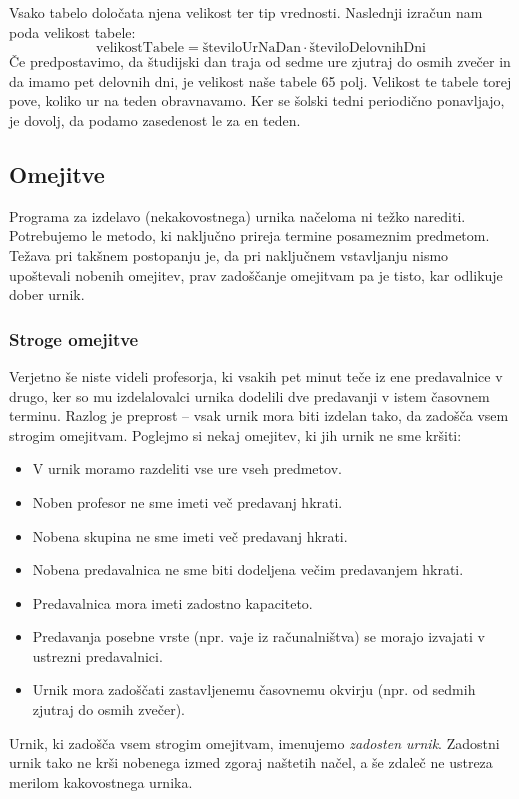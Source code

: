 \documentclass[a4paper,10pt]{article}
\begin{document}
Vsako tabelo določata njena velikost ter tip vrednosti. Naslednji izračun nam poda velikost tabele:
\[
\text{velikostTabele} = \text{številoUrNaDan} \cdot \text{številoDelovnihDni}
\]
Če predpostavimo, da študijski dan traja od sedme ure zjutraj do osmih zvečer in da imamo pet delovnih dni, je velikost naše tabele 65 polj. Velikost te tabele torej pove, koliko ur na teden obravnavamo. Ker se šolski tedni periodično ponavljajo, je dovolj, da podamo zasedenost le za en teden.
\subsection{Omejitve}
Programa za izdelavo (nekakovostnega) urnika načeloma ni težko narediti. Potrebujemo le metodo, ki naključno prireja termine posameznim predmetom. Težava pri takšnem postopanju je, da pri naključnem vstavljanju nismo upoštevali nobenih omejitev, prav zadoščanje omejitvam pa je tisto, kar odlikuje dober urnik.

\subsubsection{Stroge omejitve}
Verjetno še niste videli profesorja, ki vsakih pet minut teče iz ene predavalnice v drugo, ker so mu izdelalovalci urnika dodelili dve predavanji v istem časovnem terminu. Razlog je preprost – vsak urnik mora biti izdelan tako, da zadošča vsem strogim omejitvam. Poglejmo si nekaj omejitev, ki jih urnik ne sme kršiti:

\begin{itemize}
    \item V urnik moramo razdeliti vse ure vseh predmetov.
    \item Noben profesor ne sme imeti več predavanj hkrati.
    \item Nobena skupina ne sme imeti več predavanj hkrati.
    \item Nobena predavalnica ne sme biti dodeljena večim predavanjem hkrati.
    \item Predavalnica mora imeti zadostno kapaciteto.
    \item Predavanja posebne vrste (npr. vaje iz računalništva) se morajo izvajati v ustrezni predavalnici.
    \item Urnik mora zadoščati zastavljenemu časovnemu okvirju (npr. od sedmih zjutraj do osmih zvečer).
\end{itemize}

Urnik, ki zadošča vsem strogim omejitvam, imenujemo \emph{zadosten urnik}. Zadostni urnik tako ne krši nobenega izmed zgoraj naštetih načel, a še zdaleč ne ustreza merilom kakovostnega urnika.
\end{document}
